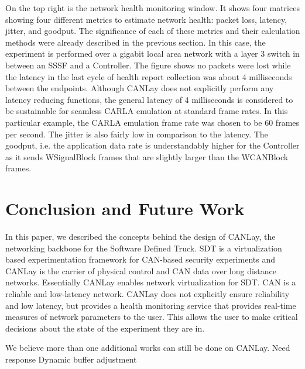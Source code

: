 \documentclass[letterpaper,twocolumn,10pt]{article}
\begin{document}
On the top right is the network health monitoring window. It shows four matrices showing
four different metrics to estimate network health: packet loss, latency, jitter, and goodput. The significance of each of these metrics and their calculation methods were already described in the previous section. In this case, the experiment is performed over a gigabit local area network with a layer 3 switch in between an SSSF and a Controller. The figure shows no packets were lost while the latency in the last cycle of health report collection was about 4 milliseconds between the endpoints. Although CANLay does not explicitly perform any latency reducing functions, the general latency of 4 milliseconds is considered to be sustainable for seamless CARLA emulation at standard frame rates. In this particular example, the CARLA emulation frame rate was chosen to be 60 frames per second. The jitter is also fairly low in comparison to the latency. The goodput, i.e. the application data rate is understandably higher for the Controller as it sends WSignalBlock frames that are slightly larger than the WCANBlock frames. 

\section{Conclusion and Future Work}
In this paper, we described the concepts behind the design of CANLay, the networking backbone for the Software Defined Truck. SDT is a virtualization based experimentation framework for CAN-based security experiments and CANLay is the carrier of physical control and CAN data over long distance networks. Essentially CANLay enables network virtualization for SDT. CAN is a reliable and low-latency network. CANLay does not explicitly ensure reliability and low latency, but provides a health monitoring service that provides real-time measures of network parameters to the user. This allows the user to make critical decisions about the state of the experiment they are in.

We believe more than one additional works can still be done on CANLay. 
Need response
Dynamic buffer adjustment
 



\end{document}
